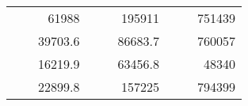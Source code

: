 \begin{table}[H]
\begin{tabular}{|ccrccrccc}
\rowcolor[HTML]{DDFDFF} 
\multicolumn{1}{|c|}{\cellcolor[HTML]{FFFFC7}}                                & \multicolumn{1}{c|}{\cellcolor[HTML]{DDFDFF}}                      & \multicolumn{1}{r|}{\cellcolor[HTML]{DAE8FC}61988}     & \multicolumn{1}{c|}{\cellcolor[HTML]{FFFFC7}}                                & \multicolumn{1}{c|}{\cellcolor[HTML]{DDFDFF}}                       & \multicolumn{1}{r|}{\cellcolor[HTML]{DDFDFF}195911}    & \multicolumn{1}{c|}{\cellcolor[HTML]{FFFFC7}}                                & \multicolumn{1}{c|}{\cellcolor[HTML]{DDFDFF}}                      & \multicolumn{1}{r|}{\cellcolor[HTML]{DDFDFF}751439}    \\ \cline{3-3} \cline{6-6} \cline{9-9} 
\multicolumn{1}{|c|}{\cellcolor[HTML]{FFFFC7}}                                & \multicolumn{1}{c|}{\cellcolor[HTML]{DDFDFF}}                      & \multicolumn{1}{r|}{\cellcolor[HTML]{DDFDFF}39703.6}   & \multicolumn{1}{c|}{\cellcolor[HTML]{FFFFC7}}                                & \multicolumn{1}{c|}{\cellcolor[HTML]{DDFDFF}}                       & \multicolumn{1}{r|}{\cellcolor[HTML]{DAE8FC}86683.7}   & \multicolumn{1}{c|}{\cellcolor[HTML]{FFFFC7}}                                & \multicolumn{1}{c|}{\cellcolor[HTML]{DDFDFF}}                      & \multicolumn{1}{r|}{\cellcolor[HTML]{DAE8FC}760057}    \\ \cline{3-3} \cline{6-6} \cline{9-9} 
\rowcolor[HTML]{DDFDFF} 
\multicolumn{1}{|c|}{\cellcolor[HTML]{FFFFC7}}                                & \multicolumn{1}{c|}{\cellcolor[HTML]{DDFDFF}}                      & \multicolumn{1}{r|}{\cellcolor[HTML]{DAE8FC}16219.9}   & \multicolumn{1}{c|}{\cellcolor[HTML]{FFFFC7}}                                & \multicolumn{1}{c|}{\cellcolor[HTML]{DDFDFF}}                       & \multicolumn{1}{r|}{\cellcolor[HTML]{DDFDFF}63456.8}   & \multicolumn{1}{c|}{\cellcolor[HTML]{FFFFC7}}                                & \multicolumn{1}{c|}{\cellcolor[HTML]{DDFDFF}}                      & \multicolumn{1}{r|}{\cellcolor[HTML]{DDFDFF}48340}     \\ \cline{3-3} \cline{6-6} \cline{9-9} 
\multicolumn{1}{|c|}{\cellcolor[HTML]{FFFFC7}}                                & \multicolumn{1}{c|}{\cellcolor[HTML]{DDFDFF}}                      & \multicolumn{1}{r|}{\cellcolor[HTML]{DDFDFF}22899.8}   & \multicolumn{1}{c|}{\cellcolor[HTML]{FFFFC7}}                                & \multicolumn{1}{c|}{\cellcolor[HTML]{DDFDFF}}                       & \multicolumn{1}{r|}{\cellcolor[HTML]{DAE8FC}157225}    & \multicolumn{1}{c|}{\cellcolor[HTML]{FFFFC7}}                                & \multicolumn{1}{c|}{\cellcolor[HTML]{DDFDFF}}                      & \multicolumn{1}{r|}{\cellcolor[HTML]{DAE8FC}794399}    \\ \cline{3-3} \cline{6-6} \cline{9-9} 

\end{tabular}
\end{table}
